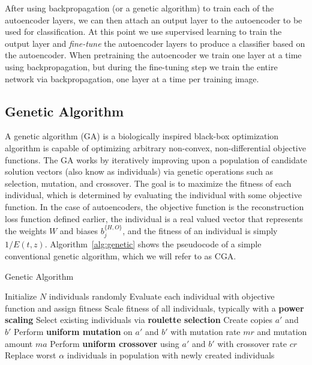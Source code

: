 After using backpropagation (or a genetic algorithm) to train each of the autoencoder layers, we can then attach an output layer to the autoencoder to be used for classification. At this
point we use supervised learning to train the output layer and \textit{fine-tune} the autoencoder layers to produce a classifier based on the autoencoder. When pretraining the autoencoder
we train one layer at a time using backpropagation, but during the fine-tuning step we train the entire network via backpropagation, one layer at a time per training image. 


\subsection{Genetic Algorithm}

A genetic algorithm (GA) is a biologically inspired black-box optimization algorithm is capable of optimizing arbitrary non-convex, non-differential objective functions. The GA works by iteratively improving upon a population of candidate solution vectors (also know as individuals) via genetic operations such as selection, mutation, and crossover. The goal is to maximize the fitness of each individual, which is determined by evaluating the individual with some objective function. In the case of autoencoders, the objective function is the reconstruction loss function defined earlier, the individual is a real valued vector that represents the weights $W$ and biases $b_j^{\{H,O\}}$, and the fitness of an individual is simply $1/E(t,z)$. Algorithm~\ref{alg:genetic} shows the pseudocode of a simple conventional genetic algorithm, which we will refer to as CGA. 

\begin{algorithm}[h]
\caption{Genetic Algorithm}
\label{alg:genetic}
\begin{algorithmic}
\STATE Initialize $N$ individuals randomly
	\STATE Evaluate each individual with objective function and assign fitness
	\STATE Scale fitness of all individuals, typically with a \textbf{power scaling}
	\STATE Select existing individuals via \textbf{roulette selection}
		\STATE Create copies $a'$ and $b'$
		\STATE Perform \textbf{uniform mutation} on $a'$ and $b'$ with mutation rate $mr$ and mutation amount $ma$
		\STATE Perform \textbf{uniform crossover} using $a'$ and $b'$ with crossover rate $cr$
	\ENDFOR
	\STATE Replace worst $\alpha$ individuals in population with newly created individuals
\ENDFOR
\end{algorithmic}
\end{algorithm}

